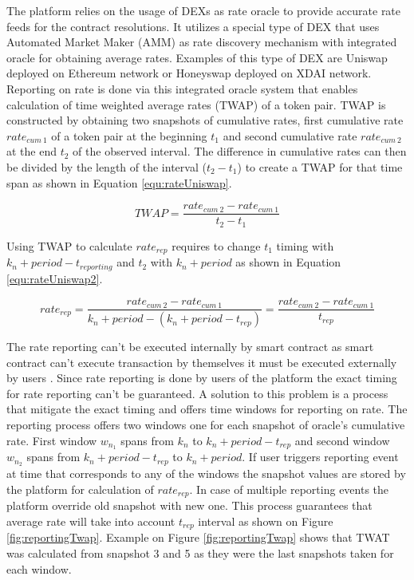 \documentclass{article}
\begin{document}
	The platform relies on the usage of DEXs as rate oracle to provide accurate rate feeds for the contract resolutions. It utilizes a special type of DEX that uses Automated Market Maker (AMM) as rate discovery mechanism with integrated oracle for obtaining average rates. Examples of this type of DEX are Uniswap \cite{Uniswap} deployed on Ethereum network or Honeyswap \cite{Honeyswap} deployed on XDAI network. Reporting on rate is done via this integrated oracle system that enables calculation of time weighted average rates (TWAP) of a token pair. TWAP is constructed by obtaining two snapshots of cumulative rates, first cumulative rate $rate_{cum\ 1}$ of a token pair at the beginning $t_1$ and second cumulative rate $rate_{cum\ 2}$ at the end $t_2$ of the observed interval. The difference in cumulative rates can then be divided by the length of the interval ($t_2-t_1$) to create a TWAP for that time span as shown in Equation \ref{equ:rateUniswap}. 
	
	\begin{equation}
		TWAP=\frac{rate_{cum\ 2} - rate_{cum\ 1}}{t_2-t_1}
		\label{equ:rateUniswap}
	\end{equation}
	
	Using TWAP to calculate $rate_{rep}$ requires to change $t_1$ timing with $k_{n}+period-t_{reporting}$ and $t_2$ with $k_n+period$ as shown in Equation \ref{equ:rateUniswap2}. 
	
	\begin{equation}
		rate_{rep}=\frac{rate_{cum\ 2} - rate_{cum\ 1}}{k_n+period-(k_{n}+period-t_{rep})}=\frac{rate_{cum\ 2} - rate_{cum\ 1}}{t_{rep}}
		\label{equ:rateUniswap2}
	\end{equation}
	
	The rate reporting can't be executed internally by smart contract as smart contract can't execute transaction by themselves it must be executed externally by users \cite{Ethereum}. Since rate reporting is done by users of the platform the exact timing for rate reporting can't be guaranteed. A solution to this problem is a process that mitigate the exact timing and offers time windows for reporting on rate. The reporting process offers two windows one for each snapshot of oracle's cumulative rate. First window $w_{n_1}$ spans from $k_n$ to $k_n+period-t_{rep}$ and second window $w_{n_2}$ spans from $k_n+period-t_{rep}$ to $k_n+period$. If user triggers reporting event at time that corresponds to any of the windows the snapshot values are stored by the platform for calculation of $rate_{rep}$. In case of multiple reporting events the platform override old snapshot with new one. This process guarantees that average rate will take into account $t_{rep}$ interval as shown on Figure \ref{fig:reportingTwap}. Example on Figure \ref{fig:reportingTwap} shows that TWAT was calculated from snapshot 3 and 5 as they were the last snapshots taken for each window.
	
\end{document}
